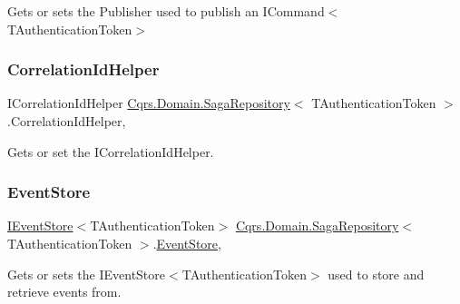 Gets or sets the Publisher used to publish an I\+Command$<$\+T\+Authentication\+Token$>$ 

\mbox{\label{classCqrs_1_1Domain_1_1SagaRepository_a654f9f7c2130864d63515f1504a750fd_a654f9f7c2130864d63515f1504a750fd}} 
\subsubsection{\texorpdfstring{Correlation\+Id\+Helper}{CorrelationIdHelper}}
{\footnotesize\ttfamily I\+Correlation\+Id\+Helper \hyperlink{classCqrs_1_1Domain_1_1SagaRepository}{Cqrs.\+Domain.\+Saga\+Repository}$<$ T\+Authentication\+Token $>$.Correlation\+Id\+Helper\hspace{0.3cm}{\ttfamily [get]}, {\ttfamily [protected]}}



Gets or set the I\+Correlation\+Id\+Helper. 

\mbox{\label{classCqrs_1_1Domain_1_1SagaRepository_a4b872f1a20660ece8ce1b54720193fda_a4b872f1a20660ece8ce1b54720193fda}} 
\subsubsection{\texorpdfstring{Event\+Store}{EventStore}}
{\footnotesize\ttfamily \hyperlink{interfaceCqrs_1_1Events_1_1IEventStore}{I\+Event\+Store}$<$T\+Authentication\+Token$>$ \hyperlink{classCqrs_1_1Domain_1_1SagaRepository}{Cqrs.\+Domain.\+Saga\+Repository}$<$ T\+Authentication\+Token $>$.\hyperlink{classCqrs_1_1Events_1_1EventStore}{Event\+Store}\hspace{0.3cm}{\ttfamily [get]}, {\ttfamily [protected]}}



Gets or sets the I\+Event\+Store$<$\+T\+Authentication\+Token$>$ used to store and retrieve events from. 

